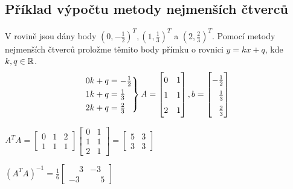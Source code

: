 \subsection{Příklad výpočtu metody nejmenších čtverců}
V rovině jsou dány body $(0, -\frac{1}{2})^T, (1, \frac{1}{3})^T$ a $(2, \frac{2}{3})^T$. Pomocí metody nejmenších 
čtverců proložme těmito body přímku o rovnici $y = kx + q$, kde $k ,q \in \mathbb{R}$.
\[
\begin{rcases*}
    0k + q = -\frac{1}{2} \\
    1k + q = \frac{1}{3} \\
    2k + q = \frac{2}{3}
\end{rcases*} 
A = 
\begin{bmatrix}
    0 & 1 \\
    1 & 1 \\
    2 & 1
\end{bmatrix},
b = 
\begingroup
    \renewcommand*{\arraystretch}{1.5}
    \begin{bmatrix}
        -\frac{1}{2} \\
        \phantom{-}\frac{1}{3} \\
        \phantom{-}\frac{2}{3}
    \end{bmatrix}
\endgroup
\]

$A^T A = 
\begin{bmatrix}
    0 & 1 & 2 \\
    1 & 1 & 1
\end{bmatrix}
\begin{bmatrix}
    0 & 1 \\
    1 & 1 \\
    2 & 1 
\end{bmatrix} =
\begin{bmatrix}
    5 & 3 \\
    3 & 3
\end{bmatrix}$

$(A^T A)^{-1} = \frac{1}{6}
\begin{bmatrix}
    \phantom{-}3 & -3 \\
    -3 & \phantom{-}5
\end{bmatrix}$

